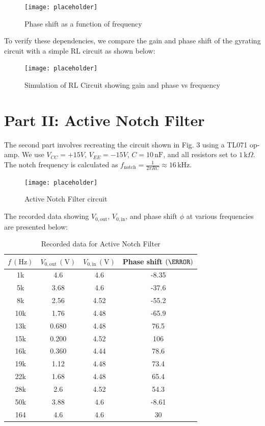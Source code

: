 \documentclass{article}
\begin{document}
\begin{figure}[H]
    \centering
    \texttt{[image: placeholder]} %
    \caption{Phase shift as a function of frequency}
    \label{fig:phase}
\end{figure}

To verify these dependencies, we compare the gain and phase shift of the 
gyrating circuit with a simple RL circuit as shown below:

\begin{figure}[H]
    \centering
    \texttt{[image: placeholder]} %
    \caption{Simulation of RL Circuit showing gain and phase vs frequency}
\end{figure}

\section*{Part II: Active Notch Filter}
The second part involves recreating the circuit shown in Fig. 3 using a TL071 
op-amp. We use \( V_{CC} = +15V \), \( V_{EE} = -15V \), \( C = 10\,\text{nF} \), 
and all resistors set to \( 1\,\text{k}\Omega \). The notch frequency is 
calculated as \( f_{\text{notch}} = \frac{1}{2\pi RC} \approx 16\,\text{kHz} \).

\begin{figure}[H]
    \centering
    \texttt{[image: placeholder]} %
    \caption{Active Notch Filter circuit}
\end{figure}

The recorded data showing \( V_{0,\text{out}} \), \( V_{0,\text{in}} \), 
and phase shift \( \phi \) at various frequencies are presented below:

\begin{table}[H]
\centering
\begin{tabular}{|c|c|c|c|}
\hline
\( f \, (\text{Hz}) \) & \( V_{0,\text{out}} \, (\text{V}) \) & \( V_{0,\text{in}} \, (\text{V}) \) & Phase shift \( (\degree) \) \\
\hline
1k   & 4.6   & 4.6  & -8.35  \\
5k   & 3.68  & 4.6  & -37.6  \\
8k   & 2.56  & 4.52 & -55.2  \\
10k  & 1.76  & 4.48 & -65.9  \\
13k  & 0.680 & 4.48 & 76.5   \\
15k  & 0.200 & 4.52 & 106    \\
16k  & 0.360 & 4.44 & 78.6   \\
19k  & 1.12  & 4.48 & 73.4   \\
22k  & 1.68  & 4.48 & 65.4   \\
28k  & 2.6   & 4.52 & 54.3   \\
50k  & 3.88  & 4.6  & -8.61  \\
164  & 4.6   & 4.6  & 30     \\
\hline
\end{tabular}
\caption{Recorded data for Active Notch Filter}
\end{table}
\end{document}
